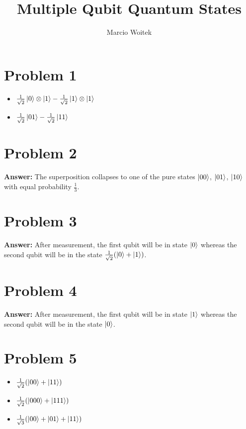 \documentclass[11pt]{article}
\author{Marcio Woitek}
\date{}
\title{Multiple Qubit Quantum States}
\newcommand{\invroot}[1]{\frac{1}{\sqrt{#1}}}
\begin{document}
\maketitle
\thispagestyle{empty}
\pagestyle{empty}
\section*{Problem 1}
\label{sec:org1086980}
\begin{itemize}
\item \(\invroot{2}\ket{0}\otimes\ket{1}-\invroot{2}\ket{1}\otimes\ket{1}\)
\item \(\invroot{2}\ket{01}-\invroot{2}\ket{11}\)
\end{itemize}
\section*{Problem 2}
\label{sec:orge797bf4}
\textbf{Answer:} The superposition collapses to one of the pure states \(\ket{00}\),
\(\ket{01}\), \(\ket{10}\) with equal probability \(\frac{1}{3}\).
\section*{Problem 3}
\label{sec:org3f3baf4}
\textbf{Answer:} After measurement, the first qubit will be in state \(\ket{0}\)
whereas the second qubit will be in the state \(\invroot{2}(\ket{0}+\ket{1})\).
\section*{Problem 4}
\label{sec:orgf3b66d3}
\textbf{Answer:} After measurement, the first qubit will be in state \(\ket{1}\)
whereas the second qubit will be in the state \(\ket{0}\).
\section*{Problem 5}
\label{sec:orgfa6973e}
\begin{itemize}
\item \(\invroot{2}(\ket{00}+\ket{11})\)
\item \(\invroot{2}(\ket{000}+\ket{111})\)
\item \(\invroot{3}(\ket{00}+\ket{01}+\ket{11})\)
\end{itemize}
\end{document}
